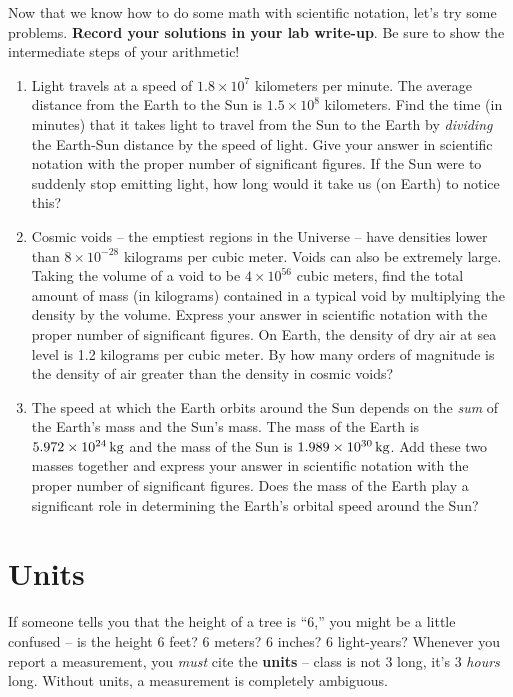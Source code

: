 \documentclass[11pt]{article}
\begin{document}
Now that we know how to do some math with scientific notation, let's try some problems. \textbf{Record your solutions in your lab write-up}. Be sure to show the intermediate steps of your arithmetic!  
\begin{enumerate}
    \item Light travels at a speed of $1.8 \times 10^7$ kilometers per minute. The average distance from the Earth to the Sun is $1.5 \times 10^8$ kilometers. Find the time (in minutes) that it takes light to travel from the Sun to the Earth by \emph{dividing} the Earth-Sun distance by the speed of light. Give your answer in scientific notation with the proper number of significant figures. If the Sun were to suddenly stop emitting light, how long would it take us (on Earth) to notice this? 
    
    \item Cosmic voids -- the emptiest regions in the Universe -- have densities lower than $8 \times 10^{-28}$ kilograms per cubic meter. Voids can also be extremely large. Taking the volume of a void to be $4 \times 10^{56}$ cubic meters, find the total amount of mass (in kilograms) contained in a typical void by multiplying the density by the volume. Express your answer in scientific notation with the proper number of significant figures. On Earth, the density of dry air at sea level is 1.2 kilograms per cubic meter. By how many orders of magnitude is the density of air greater than the density in cosmic voids?
    
    \item The speed at which the Earth orbits around the Sun depends on the \emph{sum} of the Earth's mass and the Sun's mass. The mass of the Earth is $5.972 \times 10^{24} \, {\rm kg}$ and the mass of the Sun is $1.989 \times 10^{30} \, {\rm kg}$. Add these two masses together and express your answer in scientific notation with the proper number of significant figures. Does the mass of the Earth play a significant role in determining the Earth's orbital speed around the Sun?
\end{enumerate}

\bigskip


\section{Units}
If someone tells you that the height of a tree is ``6,'' you might be a little confused -- is the height 6 feet? 6 meters? 6 inches? 6 light-years? Whenever you report a measurement, you \emph{must} cite the \textbf{units} -- class is not 3 long, it's 3 \emph{hours} long. Without units, a measurement is completely ambiguous. 
\end{document}
